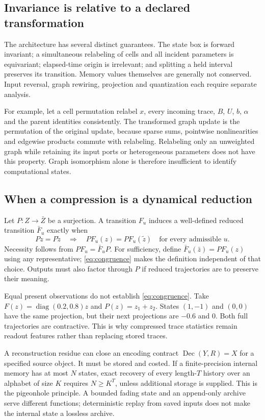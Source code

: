 \documentclass[11pt,a4paper]{article}
\theoremstyle{definition}\newtheorem{definition}[theorem]{Definition}
\begin{document}
\subsection{Invariance is relative to a declared transformation}
The architecture has several distinct guarantees. The state box is forward invariant; a simultaneous relabeling of cells and all incident parameters is equivariant; elapsed-time origin is irrelevant; and splitting a held interval preserves its transition. Memory values themselves are generally not conserved. Input reversal, graph rewiring, projection and quantization each require separate analysis.

For example, let a cell permutation relabel $x$, every incoming trace, $B$, $U$, $b$, $\alpha$ and the parent identities consistently. The transformed graph update is the permutation of the original update, because sparse sums, pointwise nonlinearities and edgewise products commute with relabeling. Relabeling only an unweighted graph while retaining its input ports or heterogeneous parameters does not have this property. Graph isomorphism alone is therefore insufficient to identify computational states.

\subsection{When a compression is a dynamical reduction}
Let $P:Z\to\bar Z$ be a surjection. A transition $F_u$ induces a well-defined reduced transition $\bar F_u$ exactly when
\begin{equation}
 Pz=P\widetilde z\quad\Longrightarrow\quad PF_u(z)=PF_u(\widetilde z)
 \quad\text{for every admissible }u.\label{eq:congruence}
\end{equation}
Necessity follows from $PF_u=\bar F_uP$. For sufficiency, define $\bar F_u(\bar z)=PF_u(z)$ using any representative; \eqref{eq:congruence} makes the definition independent of that choice. Outputs must also factor through $P$ if reduced trajectories are to preserve their meaning.

Equal present observations do not establish \eqref{eq:congruence}. Take $F(z)=\operatorname{diag}(0.2,0.8)z$ and $P(z)=z_1+z_2$. States $(1,-1)$ and $(0,0)$ have the same projection, but their next projections are $-0.6$ and $0$. Both full trajectories are contractive. This is why compressed trace statistics remain readout features rather than replacing stored traces.

A reconstruction residue can close an encoding contract $\operatorname{Dec}(Y,R)=X$ for a specified source object. It must be stored and costed. If a finite-precision internal memory has at most $N$ states, exact recovery of every length-$T$ history over an alphabet of size $K$ requires $N\geq K^T$, unless additional storage is supplied. This is the pigeonhole principle. A bounded fading state and an append-only archive serve different functions; deterministic replay from saved inputs does not make the internal state a lossless archive.
\end{document}
